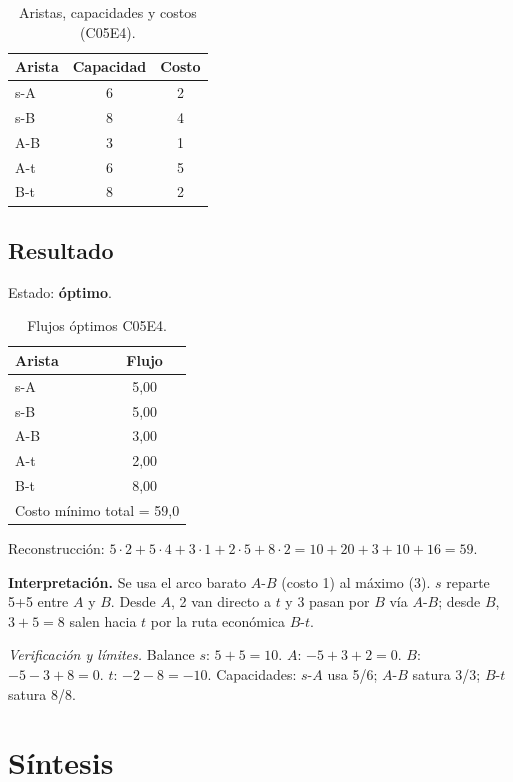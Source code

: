 \documentclass[11pt,a4paper]{article}
\newcommand{\interpretacion}[1]{\noindent\textbf{Interpretación.} #1\par}
\newcommand{\verif}[1]{\noindent\small\textit{Verificación y límites.} #1\par}
\begin{document}
\begin{table}[H]
\centering
\small
\caption{Aristas, capacidades y costos (C05E4).}
\begin{tabular}{@{}lcc@{}}
\toprule
Arista & Capacidad & Costo \\
\midrule
s-A & 6 & 2 \\
s-B & 8 & 4 \\
A-B & 3 & 1 \\
A-t & 6 & 5 \\
B-t & 8 & 2 \\
\bottomrule
\end{tabular}
\end{table}

\subsection*{Resultado}
Estado: \textbf{óptimo}.
\begin{table}[H]
\centering
\small
\caption{Flujos óptimos C05E4.}
\begin{tabular}{@{}lc@{}}
\toprule
Arista & Flujo \\
\midrule
s-A & 5{,}00 \\
s-B & 5{,}00 \\
A-B & 3{,}00 \\
A-t & 2{,}00 \\
B-t & 8{,}00 \\
\midrule
\multicolumn{2}{l}{Costo mínimo total = 59{,}0} \\
\bottomrule
\end{tabular}
\end{table}

Reconstrucción: $5{\cdot}2 + 5{\cdot}4 + 3{\cdot}1 + 2{\cdot}5 + 8{\cdot}2 = 10 + 20 + 3 + 10 + 16 = 59$.

\interpretacion{Se usa el arco barato $A$-$B$ (costo 1) al máximo (3). $s$ reparte 5+5 entre $A$ y $B$. Desde $A$, 2 van directo a $t$ y 3 pasan por $B$ vía $A$-$B$; desde $B$, $3+5=8$ salen hacia $t$ por la ruta económica $B$-$t$.}

\verif{Balance $s$: $5+5=10$. $A$: $-5+3+2=0$. $B$: $-5-3+8=0$. $t$: $-2-8=-10$. Capacidades: $s$-$A$ usa 5/6; $A$-$B$ satura 3/3; $B$-$t$ satura 8/8.}

\section{Síntesis}
\end{document}
